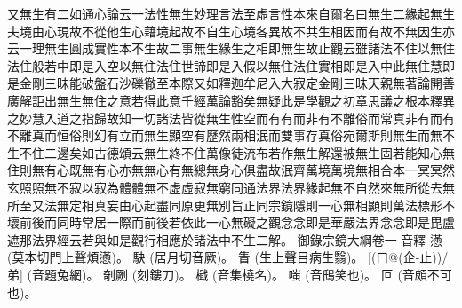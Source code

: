 又無生有二如通心論云一法性無生妙理言法至虛言性本來自爾名曰無生二緣起無生夫境由心現故不從他生心藉境起故不自生心境各異故不共生相因而有故不無因生亦云一理無生圓成實性本不生故二事無生緣生之相即無生故止觀云雖諸法不住以無住法住般若中即是入空以無住法住世諦即是入假以無住法住實相即是入中此無住慧即是金剛三昧能破盤石沙礫徹至本際又如釋迦牟尼入大寂定金剛三昧天親無著論開善廣解詎出無生無住之意若得此意千經萬論豁矣無疑此是學觀之初章思議之根本釋異之妙慧入道之指歸故知一切諸法皆從無生性空而有有而非有不離俗而常真非有而有不離真而恒俗則幻有立而無生顯空有歷然兩相泯而雙事存真俗宛爾斯則無生而無不生不住二邊矣如古德頌云無生終不住萬像徒流布若作無生解還被無生固若能知心無住則無有心既無有心亦無無心有無總無身心俱盡故泯齊萬境萬境無相合本一冥冥然玄照照無不寂以寂為體體無不虛虛寂無窮同通法界法界緣起無不自然來無所從去無所至又法無定相真妄由心起盡同原更無別旨正同宗鏡隱則一心無相顯則萬法標形不壞前後而同時常居一際而前後若依此一心無礙之觀念念即是華嚴法界念念即是毘盧遮那法界經云若與如是觀行相應於諸法中不生二解。
御錄宗鏡大綱卷一
音釋
懣
(莫本切門上聲煩懣)。
 駃
(居月切音厥)。
 眚
(生上聲目病生翳)。
 [(ㄇ@(企-止))/弟]
(音題兔網)。
 剞劂
(刻鏤刀)。
 檝
(音集橈名)。
 嗤
(音䲭笑也)。
 叵
(音頗不可也)。
